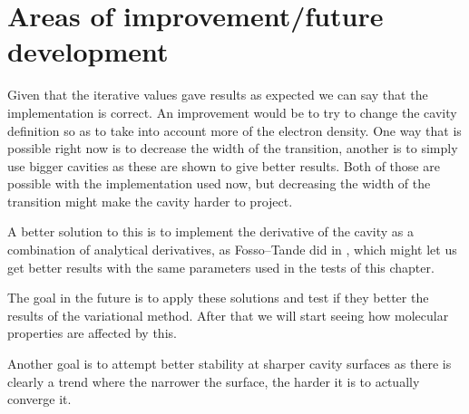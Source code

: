 \documentclass[../Thesis.tex]{subfiles}
\begin{document}
\section{Areas of improvement/future development}
Given that the iterative values gave results as expected we can say that the
implementation is correct. An improvement would be to try to change the cavity
definition so as to take into account more of the electron density. One way that is
possible right now is to decrease the width of the transition, another is to simply use
bigger cavities as these are shown to give better results. Both of those are possible
with the implementation used now, but decreasing the width of the transition might
make the cavity harder to project.

A better solution to this is to implement the derivative of the cavity as
a combination of analytical derivatives, as Fosso--Tande did in \cite{FossoTande:2013ka}, which
might let us get better results with the same parameters used in the tests of this chapter.

The goal in the future is to apply these solutions and test if they better the
results of the variational method. After that we will start seeing how molecular properties
are affected by this.

Another goal is to attempt better stability at sharper cavity surfaces as there
is clearly a trend where the narrower the surface, the harder it is to actually
converge it.



\biblio
\end{document}
